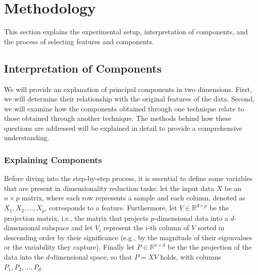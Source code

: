 \chapter{Methodology}
This section explains the experimental setup, interpretation of components, and the process of selecting features and components.


\section{Interpretation of Components}
We will provide an explanation of principal components in two dimensions. First, we will determine their relationship with the original features of the data. Second, we will examine how the components obtained through one technique relate to those obtained through another technique. The methods behind how these questions are addressed will be explained in detail to provide a comprehensive understanding.

\subsection{Explaining Components}\label{exp_comp}

Before diving into the step-by-step process, it is essential to define some variables that are present in dimensionality reduction tasks: let the input data $X$ be an $n \times p$ matrix, where each row represents a sample and each column, denoted as $X_1, X_2, ..., X_p$, corresponds to a feature. Furthermore, let $V \in \mathbb{R}^{d \times p}$ be the projection matrix, i.e., the matrix that projects $p$-dimensional data into a $d$-dimensional subspace and let $V_i$ represent the $i$-th column of $V$ sorted in descending order by their significance (e.g., by the magnitude of their eigenvalues or the variability they capture). Finally let $P \in \mathbb{R}^{n \times d}$ be the the projection of the data into the $d$-dimensional space, so that $P = XV$ holds, with columns $P_1, P_2,..., P_d$.

